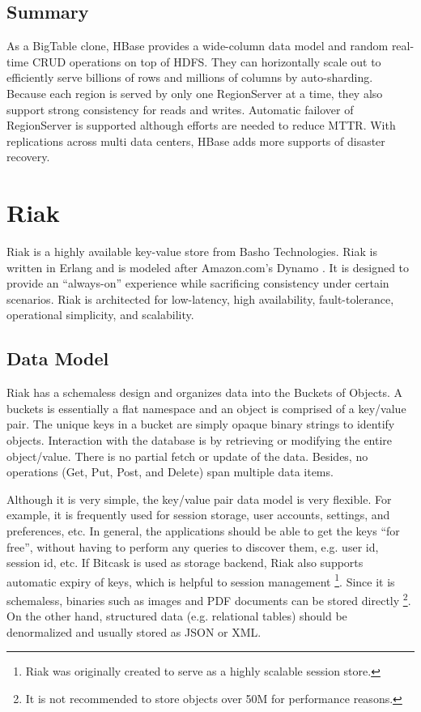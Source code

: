 \documentclass[11pt]{book}
\begin{document}
\subsection{Summary}
As a BigTable clone, HBase provides a wide-column data model and random real-time CRUD operations on top of HDFS. They can horizontally scale out to efficiently serve billions of rows and millions of columns by auto-sharding. Because each region is served by only one RegionServer at a time, they also support strong consistency for reads and writes. Automatic failover of RegionServer is supported although efforts are needed to reduce MTTR. With replications across multi data centers, HBase adds more supports of disaster recovery.

\section[Riak]
{Riak}
Riak \cite{Riak} is a highly available key-value store from Basho Technologies. Riak is written in Erlang and is modeled after Amazon.com's Dynamo \cite{DeCandia:2007:DAH}. It is designed to provide an ``always-on'' experience while sacrificing consistency under certain scenarios. Riak is architected for low-latency, high availability, fault-tolerance, operational simplicity, and scalability.

\subsection{Data Model}

Riak has a schemaless design and organizes data into the Buckets of Objects. A buckets is essentially a flat namespace and an object is comprised of a key/value pair. The unique keys in a bucket are simply opaque binary strings to identify objects. Interaction with the database is by retrieving or modifying the entire object/value. There is no partial fetch or update of the data. Besides, no operations (Get, Put, Post, and Delete) span multiple data items.

Although it is very simple, the key/value pair data model is very flexible. For example, it is frequently used for session storage, user accounts, settings, and preferences, etc. In general, the applications should be able to get the keys ``for free'', without having to perform any queries to discover them, e.g. user id, session id, etc. If Bitcask is used as storage backend, Riak also supports automatic expiry of keys, which is helpful to session management \footnote{Riak was originally created to serve as a highly scalable session store.}. Since it is schemaless, binaries such as images and PDF documents can be stored directly \footnote{It is not recommended to store objects over 50M for performance reasons.}. On the other hand, structured data (e.g. relational tables) should be denormalized and usually stored as JSON or XML.
\end{document}
